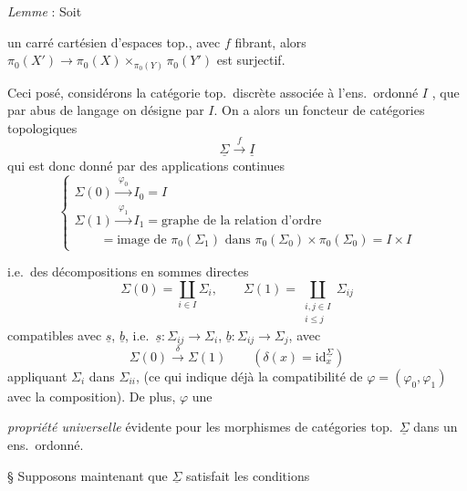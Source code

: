\documentclass[11pt,a4paper]{article}
\begin{document}
\emph{Lemme} : Soit


un carré cartésien d'espaces top., avec $f$ fibrant, alors $\pi_0(X')\to\pi_0(X)\times_{\pi_0(Y)}\pi_0(Y')$ est surjectif.

Ceci posé, considérons la catégorie top.\ discrète associée à l'ens.\ ordonné $I$ , que par abus de langage \add{\ill{}} on désigne par $I$. On a alors un foncteur  de catégories topologiques 
\[
\underline{\Sigma}\xrightarrow{\ f\ }\underline I
\]
qui est donc donné par des applications continues
\[
\left\lbrace
\begin{array}{l}
\Sigma(0)\xrightarrow{\ \varphi_0\ }I_0=I\\
\Sigma(1)\xrightarrow{\ \varphi_1\ }I_1=\text{graphe de la relation d'ordre}\\
\qquad=\text{image de }\pi_0(\Sigma_1)\text{ dans }\pi_0(\Sigma_0)\times\pi_0(\Sigma_0)=I\times I
\end{array}\right.
\]

i.e.\ des décompositions en sommes directes
\[
\Sigma(0)=\coprod_{i\in I}\Sigma_i,\qquad \Sigma(1)=\coprod_{\substack{i,j\in I\\ i\le j}}\Sigma_{ij}
\]
compatibles avec $\underline s$, $\underline b$, i.e.\ $\underline s : \Sigma_{ij}\to\Sigma_i$, $\underline b : \Sigma_{ij}\to\Sigma_j$, avec
\[
\Sigma(0)\xrightarrow{\ \delta\ }\Sigma(1)\qquad(\delta(x)=\mathrm{id}_x^{\underline{\Sigma}})
\]
appliquant $\Sigma_i$ dans $\Sigma_{ii}$, \struck{\ill{}} (ce qui indique déjà la compatibilité de $\varphi=(\varphi_0,\varphi_1)$ avec la composition). De plus, $\varphi$  une



\emph{propriété universelle} évidente pour les morphismes de  catégories top.\ $\underline{\Sigma}$ dans un ens.\ ordonné.

§ Supposons maintenant que $\underline{\Sigma}$ satisfait les conditions  
\end{document}
